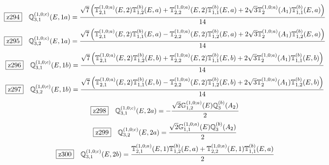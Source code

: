 \documentclass[fleqn,10pt,landscape]{jsarticle}
\begin{document}
\begin{dmath*}
\hspace*{3mm}\fbox{z294}\quad \mathbb{Q}_{3,1}^{(1,0;c)}(E,1a)=\frac{\sqrt{7} \left(\mathbb{T}_{2,1}^{(1,0;a)}(E,2) \mathbb{T}_{1,2}^{(b)}(E,a) + \mathbb{T}_{2,2}^{(1,0;a)}(E,2) \mathbb{T}_{1,1}^{(b)}(E,a) + 2 \sqrt{3} \mathbb{T}_{2}^{(1,0;a)}(A_{1}) \mathbb{T}_{1,1}^{(b)}(E,a)\right)}{14}
\end{dmath*}
\begin{dmath*}
\hspace*{3mm}\fbox{z295}\quad \mathbb{Q}_{3,2}^{(1,0;c)}(E,1a)=\frac{\sqrt{7} \left(\mathbb{T}_{2,1}^{(1,0;a)}(E,2) \mathbb{T}_{1,1}^{(b)}(E,a) - \mathbb{T}_{2,2}^{(1,0;a)}(E,2) \mathbb{T}_{1,2}^{(b)}(E,a) + 2 \sqrt{3} \mathbb{T}_{2}^{(1,0;a)}(A_{1}) \mathbb{T}_{1,2}^{(b)}(E,a)\right)}{14}
\end{dmath*}
\begin{dmath*}
\hspace*{3mm}\fbox{z296}\quad \mathbb{Q}_{3,1}^{(1,0;c)}(E,1b)=\frac{\sqrt{7} \left(\mathbb{T}_{2,1}^{(1,0;a)}(E,2) \mathbb{T}_{1,2}^{(b)}(E,b) + \mathbb{T}_{2,2}^{(1,0;a)}(E,2) \mathbb{T}_{1,1}^{(b)}(E,b) + 2 \sqrt{3} \mathbb{T}_{2}^{(1,0;a)}(A_{1}) \mathbb{T}_{1,1}^{(b)}(E,b)\right)}{14}
\end{dmath*}
\begin{dmath*}
\hspace*{3mm}\fbox{z297}\quad \mathbb{Q}_{3,2}^{(1,0;c)}(E,1b)=\frac{\sqrt{7} \left(\mathbb{T}_{2,1}^{(1,0;a)}(E,2) \mathbb{T}_{1,1}^{(b)}(E,b) - \mathbb{T}_{2,2}^{(1,0;a)}(E,2) \mathbb{T}_{1,2}^{(b)}(E,b) + 2 \sqrt{3} \mathbb{T}_{2}^{(1,0;a)}(A_{1}) \mathbb{T}_{1,2}^{(b)}(E,b)\right)}{14}
\end{dmath*}
\begin{dmath*}
\hspace*{3mm}\fbox{z298}\quad \mathbb{Q}_{3,1}^{(1,0;c)}(E,2a)=- \frac{\sqrt{2} \mathbb{G}_{1,2}^{(1,0;a)}(E) \mathbb{Q}_{3}^{(b)}(A_{2})}{2}
\end{dmath*}
\begin{dmath*}
\hspace*{3mm}\fbox{z299}\quad \mathbb{Q}_{3,2}^{(1,0;c)}(E,2a)=\frac{\sqrt{2} \mathbb{G}_{1,1}^{(1,0;a)}(E) \mathbb{Q}_{3}^{(b)}(A_{2})}{2}
\end{dmath*}
\begin{dmath*}
\hspace*{3mm}\fbox{z300}\quad \mathbb{Q}_{3,1}^{(1,0;c)}(E,2b)=\frac{\mathbb{T}_{2,1}^{(1,0;a)}(E,1) \mathbb{T}_{1,2}^{(b)}(E,a) + \mathbb{T}_{2,2}^{(1,0;a)}(E,1) \mathbb{T}_{1,1}^{(b)}(E,a)}{2}
\end{dmath*}
\end{document}
